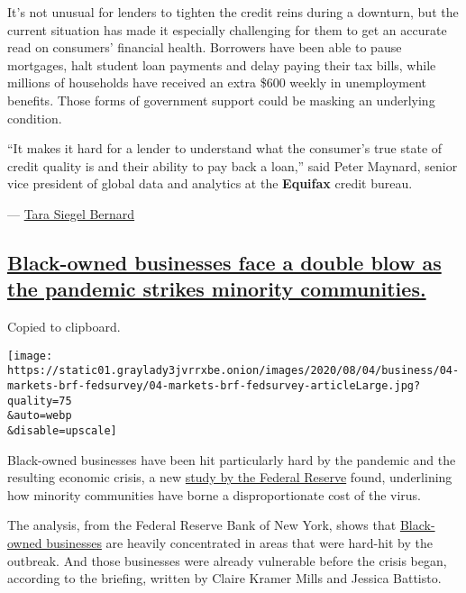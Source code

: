 It's not unusual for lenders to tighten the credit reins during a
downturn, but the current situation has made it especially challenging
for them to get an accurate read on consumers' financial health.
Borrowers have been able to pause mortgages, halt student loan payments
and delay paying their tax bills, while millions of households have
received an extra \$600 weekly in unemployment benefits. Those forms of
government support could be masking an underlying condition.

``It makes it hard for a lender to understand what the consumer's true
state of credit quality is and their ability to pay back a loan,'' said
Peter Maynard, senior vice president of global data and analytics at the
\textbf{Equifax} credit bureau.

---
\href{https://www.nytimes3xbfgragh.onion/by/tara-siegel-bernard}{Tara
Siegel Bernard}

\hypertarget{black-owned-businesses-face-a-double-blow-as-the-pandemic-strikes-minority-communities}{%
\subsection{\texorpdfstring{\protect\hyperlink{black-owned-businesses-face-a-double-blow-as-the-pandemic-strikes-minority-communities}{Black-owned
businesses face a double blow as the pandemic strikes minority
communities.}}{Black-owned businesses face a double blow as the pandemic strikes minority communities.}}\label{black-owned-businesses-face-a-double-blow-as-the-pandemic-strikes-minority-communities}}

Copied to clipboard.

\texttt{[image: https://static01.graylady3jvrrxbe.onion/images/2020/08/04/business/04-markets-brf-fedsurvey/04-markets-brf-fedsurvey-articleLarge.jpg?quality=75\\\&auto=webp\\\&disable=upscale]}

Black-owned businesses have been hit particularly hard by the pandemic
and the resulting economic crisis, a new
\href{https://www.newyorkfed.org/smallbusiness/small-business-credit-survey-2020}{study
by the Federal Reserve} found, underlining how minority communities have
borne a disproportionate cost of the virus.

The analysis, from the Federal Reserve Bank of New York, shows that
\href{https://www.nytimes3xbfgragh.onion/interactive/2020/06/18/us/coronavirus-black-owned-small-business.html}{Black-owned
businesses} are heavily concentrated in areas that were hard-hit by the
outbreak. And those businesses were already vulnerable before the crisis
began, according to the briefing, written by Claire Kramer Mills and
Jessica Battisto.

